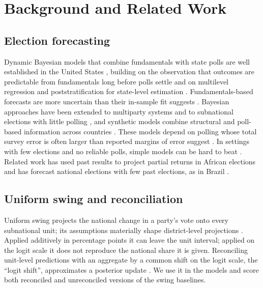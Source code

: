 \documentclass[preprint,12pt,authoryear]{elsarticle}
\begin{document}
\section{Background and Related Work}
\label{sec:related_work}

\subsection{Election forecasting}
Dynamic Bayesian models that combine fundamentals with state polls are well established in the United States \citep{Linzer2012DynamicBayesian, Heidemanns2020UpdatedDynamic, Chen2022PollsContext}, building on the observation that outcomes are predictable from fundamentals long before polls settle \citep{Gelman1993WhyAmerican} and on multilevel regression and poststratification for state-level estimation \citep{Park2004BayesianMultilevel}. Fundamentals-based forecasts are more uncertain than their in-sample fit suggests \citep{LauderdaleLinzer2015}. Bayesian approaches have been extended to multiparty systems \citep{Stoetzer2018ForecastingElections} and to subnational elections with little polling \citep{Stoetzer2025ElectionForecasting}, and synthetic models combine structural and poll-based information across countries \citep{LewisBeck2015Synthetic}. These models depend on polling whose total survey error is often larger than reported margins of error suggest \citep{Shiranimehr2018DisentanglingBias}. In settings with few elections and no reliable polls, simple models can be hard to beat \citep{Dawes1979RobustBeauty}. Related work has used past results to project partial returns in African elections \citep{Fridy2016ElectoralPredictions} and has forecast national elections with few past elections, as in Brazil \citep{Bertholini2022AgainstAll}.

\subsection{Uniform swing and reconciliation}
Uniform swing projects the national change in a party's vote onto every subnational unit; its assumptions materially shape district-level projections \citep{Erfort2026HowSwing}. Applied additively in percentage points it can leave the unit interval; applied on the logit scale it does not reproduce the national share it is given. Reconciling unit-level predictions with an aggregate by a common shift on the logit scale, the ``logit shift'', approximates a posterior update \citep{Rosenman2021RecalibrationPredictive}. We use it in the models and score both reconciled and unreconciled versions of the swing baselines.
\end{document}
